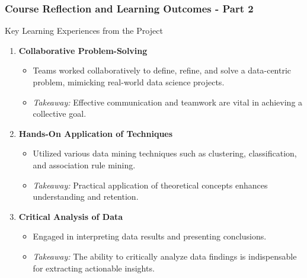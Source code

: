 \documentclass[aspectratio=169]{beamer}
\begin{document}
\begin{frame}[fragile]
    \frametitle{Course Reflection and Learning Outcomes - Part 2}
    
    \begin{block}{Key Learning Experiences from the Project}
        \begin{enumerate}
            \item \textbf{Collaborative Problem-Solving}
                \begin{itemize}
                    \item Teams worked collaboratively to define, refine, and solve a data-centric problem, mimicking real-world data science projects.
                    \item \textit{Takeaway:} Effective communication and teamwork are vital in achieving a collective goal.
                \end{itemize}
                
            \item \textbf{Hands-On Application of Techniques}
                \begin{itemize}
                    \item Utilized various data mining techniques such as clustering, classification, and association rule mining.
                    \item \textit{Takeaway:} Practical application of theoretical concepts enhances understanding and retention.
                \end{itemize}
                
            \item \textbf{Critical Analysis of Data}
                \begin{itemize}
                    \item Engaged in interpreting data results and presenting conclusions.
                    \item \textit{Takeaway:} The ability to critically analyze data findings is indispensable for extracting actionable insights.
                \end{itemize}
        \end{enumerate}
    \end{block}
\end{frame}
\end{document}
